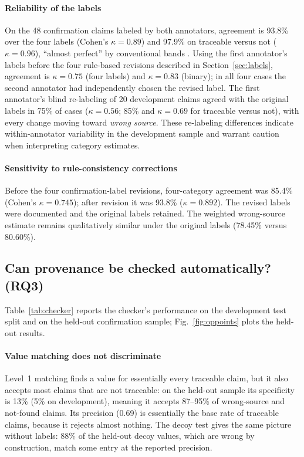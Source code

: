 \documentclass[preprint,12pt,authoryear]{elsarticle}
\begin{document}
\paragraph{Reliability of the labels} On the 48 confirmation claims labeled by both annotators, agreement is 93.8\% over the four labels (Cohen's $\kappa=0.89$) and 97.9\% on traceable versus not ($\kappa=0.96$), ``almost perfect'' by conventional bands \citep{landis1977kappa}. Using the first annotator's labels before the four rule-based revisions described in Section~\ref{sec:labels}, agreement is $\kappa=0.75$ (four labels) and $\kappa=0.83$ (binary); in all four cases the second annotator had independently chosen the revised label. The first annotator's blind re-labeling of 20 development claims agreed with the original labels in 75\% of cases ($\kappa=0.56$; 85\% and $\kappa=0.69$ for traceable versus not), with every change moving toward \emph{wrong source}. These re-labeling differences indicate within-annotator variability in the development sample and warrant caution when interpreting category estimates.

\paragraph{Sensitivity to rule-consistency corrections} Before the four confirmation-label revisions, four-category agreement was 85.4\% (Cohen's $\kappa=0.745$); after revision it was 93.8\% ($\kappa=0.892$). The revised labels were documented and the original labels retained. The weighted wrong-source estimate remains qualitatively similar under the original labels (78.45\% versus 80.60\%).

\subsection{Can provenance be checked automatically? (RQ3)}\label{sec:res-checker}

Table~\ref{tab:checker} reports the checker's performance on the development test split and on the held-out confirmation sample; Fig.~\ref{fig:oppoints} plots the held-out results.

\paragraph{Value matching does not discriminate} Level~1 matching finds a value for essentially every traceable claim, but it also accepts most claims that are not traceable: on the held-out sample its specificity is 13\% (5\% on development), meaning it accepts 87--95\% of wrong-source and not-found claims. Its precision (0.69) is essentially the base rate of traceable claims, because it rejects almost nothing. The decoy test gives the same picture without labels: 88\% of the held-out decoy values, which are wrong by construction, match some entry at the reported precision.
\end{document}
